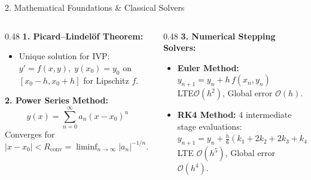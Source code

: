 \documentclass[aspectratio=169]{beamer}
\newcommand{\Rconv}{R_{\mathrm{conv}}}
\newcommand{\OO}{\mathcal{O}}
\begin{document}
\begin{frame}{2. Mathematical Foundations \& Classical Solvers}
  \small
  \begin{columns}[T]
    \begin{column}{0.48\textwidth}
      \textbf{1. Picard--Lindelöf Theorem\footnotemark[1]:}
      \begin{itemize}\small
        \item Unique solution for IVP\footnotemark[5]:
        $y' = f(x, y), \; y(x_0) = y_0$
        on $[x_0 - h, x_0 + h]$ for Lipschitz $f$.
      \end{itemize}
      \vskip2pt
      \textbf{2. Power Series Method\footnotemark[2]:}
      $$y(x) = \sum_{n=0}^{\infty} a_n (x-x_0)^n$$
      Converges for $|x-x_0| < \Rconv = \liminf_{n\to\infty} |a_n|^{-1/n}$.
    \end{column}
    \begin{column}{0.48\textwidth}
      \textbf{3. Numerical Stepping Solvers:}
      \begin{itemize}\small
        \item \color{primary}\textbf{Euler Method\footnotemark[3]:}
        $y_{n+1} = y_n + h\,f(x_n, y_n)$ \\
        LTE\footnotemark[6] $\OO(h^2)$, Global error $\OO(h)$.
        \item \color{secondary}\textbf{RK4 Method\footnotemark[4]:}
        4 intermediate stage evaluations:
        $y_{n+1} = y_n + \tfrac{h}{6}(k_1 + 2k_2 + 2k_3 + k_4)$ \\
        LTE $\OO(h^5)$, Global error $\OO(h^4)$.
      \end{itemize}
    \end{column}
  \end{columns}
  \vskip4pt
\end{frame}
\end{document}
